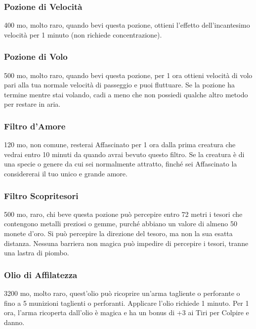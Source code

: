 \begin{multicols}{2}
\subsubsection*{Pozione di Velocità}
400 mo, molto raro, quando bevi questa pozione, ottieni l'effetto dell'incantesimo velocità per 1 minuto (non richiede concentrazione).

\subsubsection*{Pozione di Volo}
500 mo, molto raro, quando bevi questa pozione, per 1 ora ottieni velocità di volo pari alla tua normale velocità di passeggio e puoi fluttuare. Se la pozione ha termine mentre stai volando, cadi a meno che non possiedi qualche altro metodo per restare in aria.

\subsubsection*{Filtro d'Amore}
120 mo, non comune, resterai Affascinato per 1 ora dalla prima creatura che vedrai entro 10 minuti da quando avrai bevuto questo filtro. Se la creatura è di una specie o genere da cui sei normalmente attratto, finché sei Affascinato la considererai il tuo unico e grande amore.

\subsubsection*{Filtro Scopritesori}
500 mo, raro, chi beve questa pozione può percepire entro 72 metri i tesori che contengono metalli preziosi o gemme, purché abbiano un valore di almeno 50 monete d’oro. Si può percepire la direzione del tesoro, ma non la sua esatta distanza. Nessuna barriera non magica può impedire di percepire i tesori, tranne una lastra di piombo.

\subsubsection*{Olio di Affilatezza}
3200 mo, molto raro, quest'olio può ricoprire un'arma tagliente o perforante o fino a 5 munizioni taglienti o perforanti. Applicare l'olio richiede 1 minuto. Per 1 ora, l'arma ricoperta dall'olio è magica e ha un bonus di +3 ai Tiri per Colpire e danno.


\end{multicols}
